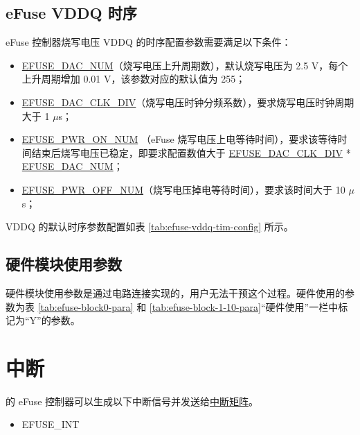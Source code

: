 \documentclass[main\_\_CN.tex]{subfiles}
\begin{document}
\subsection{eFuse VDDQ 时序}
\label{sec:efuse-vddq-timing}

eFuse 控制器烧写电压 VDDQ 的时序配置参数需要满足以下条件：
\begin{itemize}
    \item \hyperref[fielddesc:EFUSEDACNUM]{EFUSE\_DAC\_NUM}（烧写电压上升周期数），默认烧写电压为 2.5 V，每个上升周期增加 0.01 V，该参数对应的默认值为 255；
    \item \hyperref[fielddesc:EFUSEDACCLKDIV]{EFUSE\_DAC\_CLK\_DIV}（烧写电压时钟分频系数），要求烧写电压时钟周期大于 1 $\mu$s；
    \item \hyperref[fielddesc:EFUSEPWRONNUM]{EFUSE\_PWR\_ON\_NUM} （eFuse 烧写电压上电等待时间），要求该等待时间结束后烧写电压已稳定，即要求配置数值大于 \hyperref[fielddesc:EFUSEDACCLKDIV]{EFUSE\_DAC\_CLK\_DIV} * \hyperref[fielddesc:EFUSEDACNUM]{EFUSE\_DAC\_NUM}；
    \item \hyperref[fielddesc:EFUSEPWROFFNUM]{EFUSE\_PWR\_OFF\_NUM}（烧写电压掉电等待时间），要求该时间大于 10 $\mu$s；
\end{itemize}

VDDQ 的默认时序参数配置如表 \ref{tab:efuse-vddq-tim-config} 所示。\\



\subsection{硬件模块使用参数}

硬件模块使用参数是通过电路连接实现的，用户无法干预这个过程。硬件使用的参数为表 \ref{tab:efuse-block0-para} 和 \ref{tab:efuse-block-1-10-para}“硬件使用”一栏中标记为“Y”的参数。



\section{中断}


\chipname{} 的 eFuse 控制器可以生成以下中断信号并发送给\hyperref[mod:intmtrx]{中断矩阵}。

    \begin{itemize}
        \item EFUSE\_INT
    \end{itemize}
\end{document}
